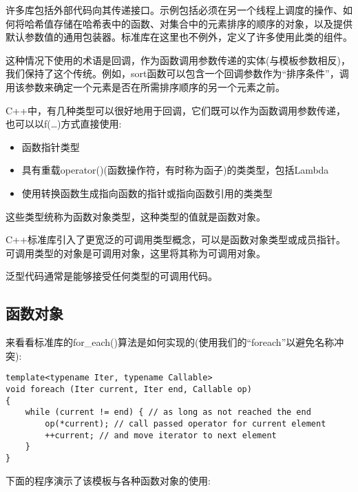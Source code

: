 
许多库包括外部代码向其传递接口。示例包括必须在另一个线程上调度的操作、如何将哈希值存储在哈希表中的函数、对集合中的元素排序的顺序的对象，以及提供默认参数值的通用包装器。标准库在这里也不例外，定义了许多使用此类的组件。

这种情况下使用的术语是回调，作为函数调用参数传递的实体(与模板参数相反)，我们保持了这个传统。例如，sort函数可以包含一个回调参数作为“排序条件”，调用该参数来确定一个元素是否在所需排序顺序的另一个元素之前。

C++中，有几种类型可以很好地用于回调，它们既可以作为函数调用参数传递，也可以以f(…)方式直接使用:

\begin{itemize}
\item
函数指针类型

\item
具有重载operator()(函数操作符，有时称为函子)的类类型，包括Lambda

\item
使用转换函数生成指向函数的指针或指向函数引用的类类型
\end{itemize}

这些类型统称为函数对象类型，这种类型的值就是函数对象。

C++标准库引入了更宽泛的可调用类型概念，可以是函数对象类型或成员指针。可调用类型的对象是可调用对象，这里将其称为可调用对象。

泛型代码通常是能够接受任何类型的可调用代码。

\subsection{函数对象}

来看看标准库的for\_each()算法是如何实现的(使用我们的“foreach”以避免名称冲突):

\begin{lstlisting}[style=styleCXX]
template<typename Iter, typename Callable>
void foreach (Iter current, Iter end, Callable op)
{
	while (current != end) { // as long as not reached the end
		op(*current); // call passed operator for current element
		++current; // and move iterator to next element
	}
}
\end{lstlisting}

下面的程序演示了该模板与各种函数对象的使用:

